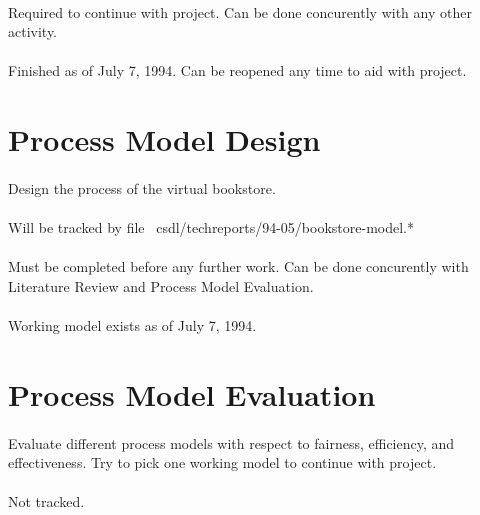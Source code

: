 \begin{noindent}
\paragraph{}Required to continue with project.  Can be done concurently with any other
activity.

\paragraph{}Finished as of July 7, 1994.  Can be reopened any time to aid with project.

\section{Process Model Design}

\paragraph{}Design the process of the virtual bookstore.

\paragraph{}Will be tracked by file ~csdl/techreports/94-05/bookstore-model.*

\paragraph{}Must be completed before any further work.  Can be done concurently with
Literature Review and Process Model Evaluation.

\paragraph{}Working model exists as of July 7, 1994.

\section{Process Model Evaluation}

\paragraph{}Evaluate different process models with respect to fairness, efficiency, and
effectiveness.  Try to pick one working model to continue with project.

\paragraph{}Not tracked.


\end{noindent}
